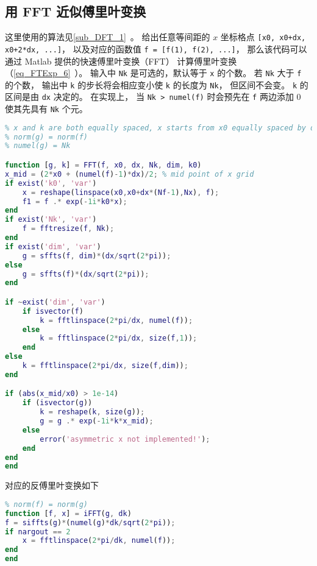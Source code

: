 \subsection{用 FFT 近似傅里叶变换}
这里使用的算法见\autoref{sub_DFT_1}~。 给出任意等间距的 $x$ 坐标格点 \verb|[x0, x0+dx, x0+2*dx, ...]|， 以及对应的函数值 \verb|f = [f(1), f(2), ...]|， 那么该代码可以通过 Matlab 提供的快速傅里叶变换（FFT） 计算傅里叶变换（\autoref{eq_FTExp_6}~）。 输入中 \verb|Nk| 是可选的，默认等于 \verb|x| 的个数。 若 \verb|Nk| 大于 \verb|f| 的个数， 输出中 \verb|k| 的步长将会相应变小使 \verb|k| 的长度为 \verb|Nk|， 但区间不会变。 \verb|k| 的区间是由 \verb|dx| 决定的。 在实现上， 当 \verb|Nk > numel(f)| 时会预先在 \verb|f| 两边添加 0 使其先具有 \verb|Nk| 个元。
\begin{lstlisting}[language=matlab, caption=FFT.m]
% fft approximation of the analytical fourier transform from f(x) to g(k)
% x and k are both equally spaced, x starts from x0 equally spaced by dx
% norm(g) = norm(f)
% numel(g) = Nk

function [g, k] = FFT(f, x0, dx, Nk, dim, k0)
x_mid = (2*x0 + (numel(f)-1)*dx)/2; % mid point of x grid
if exist('k0', 'var')
    x = reshape(linspace(x0,x0+dx*(Nf-1),Nx), f);
    f1 = f .* exp(-1i*k0*x);
end
if exist('Nk', 'var')
    f = fftresize(f, Nk);
end
if exist('dim', 'var')
    g = sffts(f, dim)*(dx/sqrt(2*pi));
else
    g = sffts(f)*(dx/sqrt(2*pi));
end

if ~exist('dim', 'var')
    if isvector(f)
        k = fftlinspace(2*pi/dx, numel(f));
    else
        k = fftlinspace(2*pi/dx, size(f,1));
    end
else
    k = fftlinspace(2*pi/dx, size(f,dim));
end

if (abs(x_mid/x0) > 1e-14)
    if (isvector(g))
        k = reshape(k, size(g));
        g = g .* exp(-1i*k*x_mid);
    else
        error('asymmetric x not implemented!');
    end
end
end
\end{lstlisting}
对应的反傅里叶变换如下
\begin{lstlisting}[language=matlab, caption=iFFT.m]
% fft approximation of the analytical inverse fourier transform
% norm(f) = norm(g)
function [f, x] = iFFT(g, dk)
f = siffts(g)*(numel(g)*dk/sqrt(2*pi));
if nargout == 2
    x = fftlinspace(2*pi/dk, numel(f));
end
end
\end{lstlisting}

